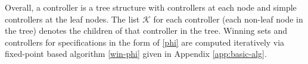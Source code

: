 Overall, a controller is a tree structure with controllers at each node and simple controllers at the leaf nodes. The list $\mathcal{K}$ for each controller (each non-leaf node in the tree) denotes the children of that controller in the tree. Winning sets and controllers for specifications in the form of \eqref{phi} are computed iteratively via fixed-point based algorithm \eqref{win-phi} given in Appendix \ref{app:basic-alg}.




